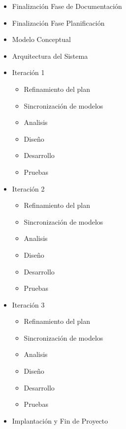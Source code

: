 \begin{itemize}[-]
  \item Finalización Fase de Documentación
  \item Finalización Fase Planificación
  \item Modelo Conceptual
  \item Arquitectura del Sistema
  \item Iteración 1
  \begin{itemize}[-]
    \item Refinamiento del plan
    \item Sincronización de modelos
    \item Analisis
    \item Diseño
    \item Desarrollo
    \item Pruebas
  \end{itemize}
  \item Iteración 2
  \begin{itemize}[-]
    \item Refinamiento del plan
    \item Sincronización de modelos
    \item Analisis
    \item Diseño
    \item Desarrollo
    \item Pruebas
  \end{itemize}
  \item Iteración 3
  \begin{itemize}[-]
    \item Refinamiento del plan
    \item Sincronización de modelos
    \item Analisis
    \item Diseño
    \item Desarrollo
    \item Pruebas
  \end{itemize}
  \item Implantación y Fin de Proyecto
\end{itemize}

